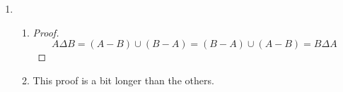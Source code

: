 \documentclass[12pt,letterpaper]{article}
\begin{document}
\begin{enumerate}
\begin{enumerate}
          \begin{proof}
            \begin{align*}
              (a, b) = (x, y)
              &\iff \{\{a\}, \{a, b\}\} = \{\{x\}, \{x, y\}\} \\
              &\iff \left(\{\{a\}, \{a, b\}\} \subseteq \{\{x\}, \{x, y\}\}\right) \\
              &\quad\quad \land \left(\{\{x\}, \{x, y\}\} \subseteq \{\{a\}, \{a, b\}\}\right)
              \\
              &\iff \left(\{a\} \in \{\{x\}, \{x, y\}\}\right) \\
              &\quad\quad \land \left(\{a, b\} \in \{\{x\}, \{x, y\}\}\right) \\
              &\quad\quad \land \left(\{x\} \in \{\{a\}, \{a, b\}\}\right) \\
              &\quad\quad \land \left(\{x, y\} \in \{\{a\}, \{a, b\}\}\right)
              \\
              &\iff \left(\{a\} = \{x\}\right) \land \left(\{a, b\} = \{x, y\}\right)
              \\
              &\iff \left(a = x\right) \land \left(b = y\right)
              \\
            \end{align*}

            Since we have connected both sides with a series of bi-conditional statements,
            we have proven that:

            $(a, b) = (x, y)$ iff $a = x$ and $b = y$.
          \end{proof}
        \item
          \begin{enumerate}
            \item
              \begin{proof}
                \[
                  A \Delta B = \left(A - B\right) \cup \left(B - A\right) = \left(B - A\right) \cup \left(A - B\right) = B \Delta A
                \]
              \end{proof}
            \item
              This proof is a bit longer than the others.


\end{enumerate}
\end{enumerate}
\end{enumerate}
\end{document}

